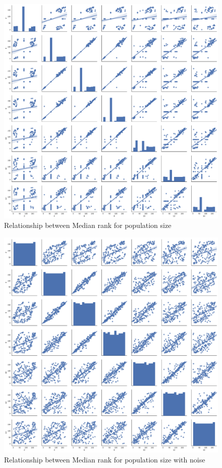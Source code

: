 \documentclass{article}
\begin{document}
\begin{figure}[!hbtp]
    \centering
    \includegraphics[width=\textwidth]{../img/relationship_between_median_ranks_std.pdf}
    \caption{Relationship between Median rank for population size}
    \label{fig:relationship_ranks_v_size_standard}
\end{figure}

\begin{figure}[!hbtp]
    \centering
    \includegraphics[width=\textwidth]{../img/relationship_between_median_ranks_noisy.pdf}
    \caption{Relationship between Median rank for population size with noise}
    \label{fig:relationship_ranks_v_size_noise}
\end{figure}
\end{document}
